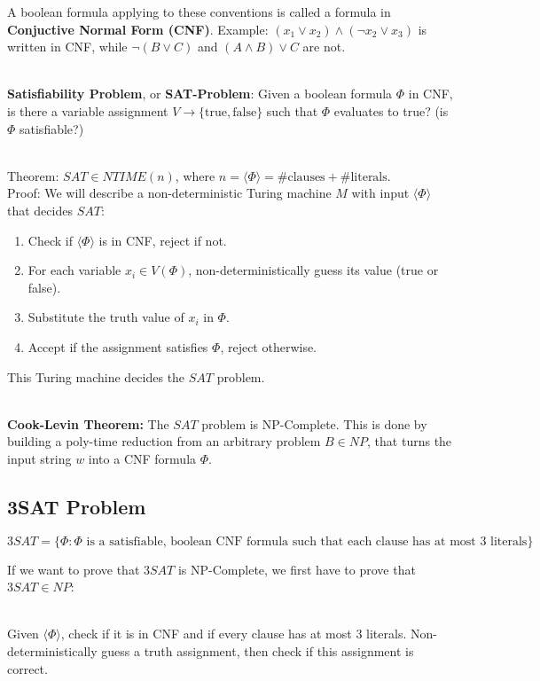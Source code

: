 \documentclass[12pt]{article}
\begin{document}
\noindent
A boolean formula applying to these conventions is called a formula in \textbf{Conjuctive Normal Form (CNF)}.
Example: $(x_1 \lor x_2) \land (\neg x_2 \lor x_3)$ is written in CNF, while $\neg (B \lor C)$ and $(A \land B) \lor C$ are not.

\noindent
\\
\textbf{Satisfiability Problem}, or \textbf{SAT-Problem}: Given a boolean formula $\Phi$ in CNF, is there a variable assignment $V \rightarrow \{\text{true},\text{false}\}$ such that $\Phi$ evaluates to true? (is $\Phi$ satisfiable?)

\noindent
\\
Theorem: $SAT \in NTIME(n)$, where $n = \langle \Phi \rangle = \#\text{clauses} + \#\text{literals}$.\\
Proof: We will describe a non-deterministic Turing machine $M$ with input $\langle \Phi \rangle$ that decides $SAT$:

\begin{enumerate}
    \item Check if $\langle \Phi \rangle$ is in CNF, reject if not.
    \item For each variable $x_i \in V(\Phi)$, non-deterministically guess its value (true or false).
    \item Substitute the truth value of $x_i$ in $\Phi$.
    \item Accept if the assignment satisfies $\Phi$, reject otherwise.
\end{enumerate}

\noindent
This Turing machine decides the $SAT$ problem.

\noindent
\\
\textbf{Cook-Levin Theorem:} The $SAT$ problem is NP-Complete.
This is done by building a poly-time reduction from an arbitrary problem $B \in NP$, that turns the input string $w$ into a CNF formula $\Phi$.

\subsection*{3SAT Problem}
\[ 3SAT = \{ \Phi : \Phi \text{ is a satisfiable, boolean CNF formula such that each clause has at most 3 literals} \} \]

\noindent
If we want to prove that $3SAT$ is NP-Complete, we first have to prove that $3SAT \in NP$:

\noindent
\\
Given $\langle \Phi \rangle$, check if it is in CNF and if every clause has at most 3 literals.
Non-deterministically guess a truth assignment, then check if this assignment is correct.
\end{document}
